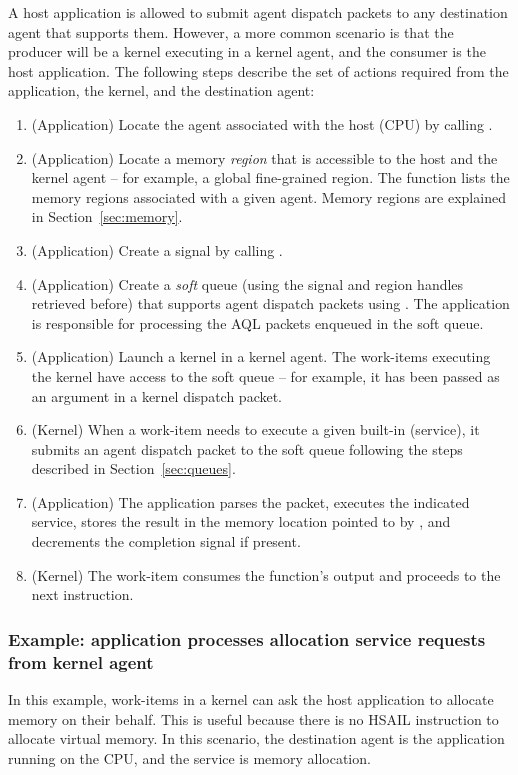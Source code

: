 \documentclass[final,oneside]{book}
\begin{document}
A host application is allowed to submit agent dispatch packets to any
destination agent that supports them. However, a more common scenario is
that the producer will be a kernel executing in a kernel agent, and the
consumer is the host application. The following steps describe the set of
actions required from the application, the kernel, and the destination agent:
\begin{enumerate}[itemsep=1pt,topsep=3pt,partopsep=0pt]
\item (Application) Locate the agent associated with the host (CPU) by
  calling .
\item (Application) Locate a memory \textit{region} that is accessible to the
  host and the kernel agent -- for example, a global fine-grained region. The
  function  lists the memory regions
  associated with a given agent. Memory regions are explained in
  Section~\ref{sec:memory}.
\item (Application) Create a signal by calling .
\item (Application) Create a \textit{soft} queue (using the signal and region
  handles retrieved before) that supports agent dispatch packets using
  . The application is responsible for processing
  the AQL packets enqueued in the soft queue.
\item (Application) Launch a kernel in a kernel agent. The work-items
  executing the kernel have access to the soft queue -- for example, it has
  been passed as an argument in a kernel dispatch packet.
\item (Kernel) When a work-item needs to execute a given built-in (service), it
  submits an agent dispatch packet to the soft queue following the steps
  described in Section~\ref{sec:queues}.
\item (Application) The application parses the packet, executes the
  indicated service, stores the result in the memory location pointed to by
  , and decrements the
  completion signal if present.
\item (Kernel) The work-item consumes the function's output and proceeds to the
  next instruction.
\end{enumerate}

\subsubsection{Example: application processes allocation service requests from
  kernel agent}
In this example, work-items in a kernel can ask the host application to
allocate memory on their behalf. This is useful because there is no HSAIL
instruction to allocate virtual memory. In this scenario, the destination
agent is the application running on the CPU, and the service is memory
allocation.
\end{document}
